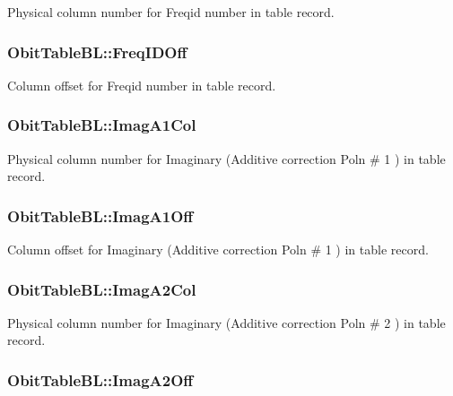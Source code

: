 Physical column number for Freqid number in table record. 

\subsubsection{ {\bf Obit\-Table\-BL::Freq\-IDOff}}\label{structObitTableBL_o28}


Column offset for Freqid number in table record. 

\subsubsection{ {\bf Obit\-Table\-BL::Imag\-A1Col}}\label{structObitTableBL_o37}


Physical column number for Imaginary (Additive correction Poln \# 1 ) in table record. 

\subsubsection{ {\bf Obit\-Table\-BL::Imag\-A1Off}}\label{structObitTableBL_o36}


Column offset for Imaginary (Additive correction Poln \# 1 ) in table record. 

\subsubsection{ {\bf Obit\-Table\-BL::Imag\-A2Col}}\label{structObitTableBL_o45}


Physical column number for Imaginary (Additive correction Poln \# 2 ) in table record. 

\subsubsection{ {\bf Obit\-Table\-BL::Imag\-A2Off}}\label{structObitTableBL_o44}


